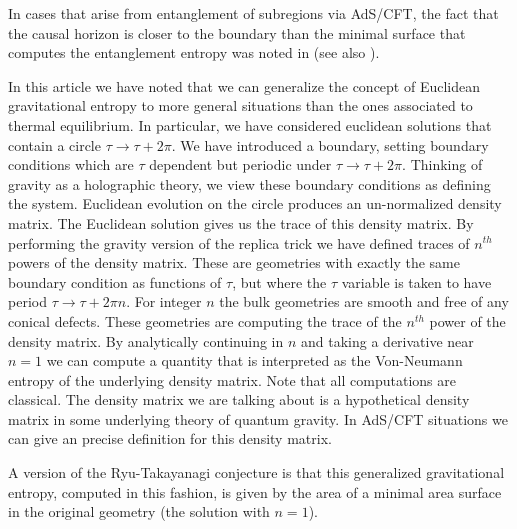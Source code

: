 In cases that arise from  entanglement of subregions via AdS/CFT,
 the fact that the causal horizon is closer to the boundary
than the minimal surface that computes the entanglement entropy was noted in \HubenyXT (see also
 ).





In this article we have noted that we can generalize the concept of Euclidean gravitational entropy
to more general situations than the ones associated to thermal equilibrium.
In particular, we have considered euclidean solutions that contain a circle $\tau \to \tau + 2 \pi $.
We have introduced a boundary, setting boundary conditions which  are $\tau$
dependent but  periodic under $\tau \to \tau + 2 \pi $. Thinking of gravity as a holographic
theory, we view these boundary conditions as defining the system. Euclidean evolution on the circle produces an
un-normalized density matrix. The Euclidean solution gives us the trace of this density matrix.
By performing the gravity version of the replica trick we have defined traces of $n^{th}$ powers of the
density matrix. These are geometries with exactly the same boundary condition as functions of $\tau$,
but where the $\tau$ variable is taken
to have period $\tau \to \tau + 2 \pi n$. For integer $n$ the bulk geometries are smooth and free of any conical
defects. These geometries are computing the trace of the $n^{th}$ power of the density matrix.
By analytically continuing in $n$ and taking a derivative near $n=1$ we can compute a quantity that is
interpreted as the Von-Neumann entropy of the underlying density matrix.
Note that all computations are classical.
 The density matrix we are talking about is a hypothetical density matrix
in some underlying theory of quantum gravity. In AdS/CFT situations we can give an precise definition for this
density matrix.

A version of the Ryu-Takayanagi conjecture is that this generalized gravitational entropy, computed in this fashion, is
given by the area of a minimal area surface in the original geometry (the solution with $n=1$).

